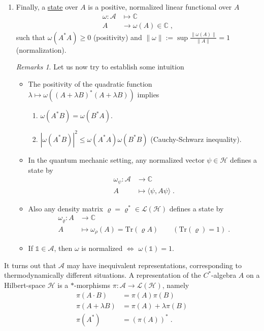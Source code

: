 \documentclass[
a4paper, %
11pt, %
onecolumn, %
openany, %
]{memoir}
\theoremstyle{definition}
\theoremstyle{remark}
\newtheorem{remarks}[definition]{Remarks}
\theoremstyle{plain}
\begin{document}
\begin{enumerate}
\begin{remarks}
\end{remarks}
\item Finally, a \underline{state} over $A$ is a positive, normalized linear functional over $A$ \begin{align*}
\omega:\mathcal{A}&\longmapsto \mathbb{C}\\
A&\longrightarrow \omega(A)\in\mathbb{C}\; ,
\end{align*}
such that $\omega(A^*A)\geq 0$ (positivity) and $\|\omega \| :=\sup \frac{\|\omega(A)\|}{\|A\|}=1$ (normalization).
\begin{remarks}
	Let us now try to establish some intuition \begin{itemize}
		\item The positivity of the quadratic function $\lambda\mapsto \omega((A+\lambda B)^*(A+\lambda B))$ implies 
		\begin{enumerate}
			\item $\omega(A^*B)=\omega(B^*A)$.
			\item $|\omega(A^*B)|^2\leq \omega(A^*A)\omega(B^*B)$ (Cauchy-Schwarz inequality).
		\end{enumerate}
		\item In the quantum mechanic setting, any normalized vector $\psi\in\mathcal{H}$ defines a state by \begin{align}\omega_{\psi}:\mathcal{A}&\longrightarrow \mathbb{C}\\
		A&\longmapsto \langle \psi, A\psi\rangle \; .\end{align}
		\item Also any density matrix $\varrho = \varrho^*\in \mathcal{L}(\mathcal{H})$ defines a state by \begin{align}
		\omega_{\varrho}:A&\longrightarrow \mathbb{C}\\
		A&\longmapsto \omega_{\rho}(A)=\mathrm{Tr}(\varrho A) \qquad (\mathrm{Tr}(\varrho)=1) \; .
		\end{align}
		\item If $\mathds{1}\in\mathcal{A}$, then $\omega$ is normalized $\Leftrightarrow$ $\omega(\mathds{1})=1$.
		\end{itemize}
\end{remarks}
\end{enumerate}
It turns out that $\mathcal{A}$ may have inequivalent representations, corresponding to thermodynamically different situations. A representation of the $C^*$-algebra $A$ on a Hilbert-space $\mathcal{H}$ is a $*$-morphisms
$\pi:\mathcal{A}\longrightarrow \mathcal{L}(\mathcal{H})$, namely \begin{align}
\pi(A\cdot B)&=\pi(A)\pi(B) \\
\pi(A+\lambda B)&=\pi(A)+\lambda\pi(B)\\
\pi(A^*)&=(\pi(A))^*\;.
\end{align}
\end{document}
